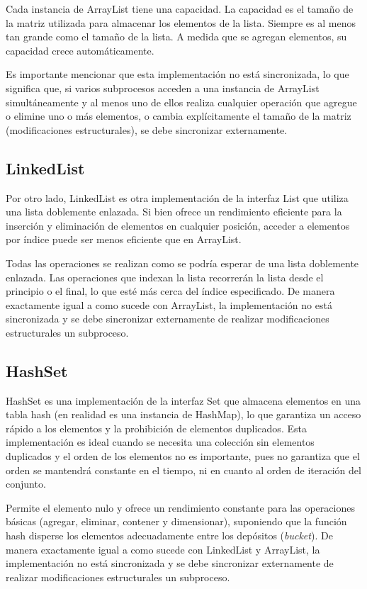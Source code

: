 \documentclass[a4paper,12pt]{article}
\begin{document}
Cada instancia de ArrayList tiene una capacidad. La capacidad es el tamaño de la matriz utilizada para almacenar los elementos de la lista. Siempre es al menos tan grande como el tamaño de la lista. A medida que se agregan elementos, su capacidad crece automáticamente.  \cite{array_list}

Es importante mencionar que esta implementación no está sincronizada, lo que significa que, si varios subprocesos acceden a una instancia de ArrayList simultáneamente y al menos uno de ellos realiza cualquier operación que agregue o elimine uno o más elementos, o cambia explícitamente el tamaño de la matriz (modificaciones estructurales), se debe sincronizar externamente. \cite{array_list}

\subsection{LinkedList}

Por otro lado, LinkedList es otra implementación de la interfaz List que utiliza una lista doblemente enlazada. Si bien ofrece un rendimiento eficiente para la inserción y eliminación de elementos en cualquier posición, acceder a elementos por índice puede ser menos eficiente que en ArrayList.

Todas las operaciones se realizan como se podría esperar de una lista doblemente enlazada. Las operaciones que indexan la lista recorrerán la lista desde el principio o el final, lo que esté más cerca del índice especificado.\cite{linked_list} De manera exactamente igual a como sucede con ArrayList, la implementación no está sincronizada y se debe sincronizar externamente de realizar modificaciones estructurales un subproceso.

\subsection{HashSet}

HashSet es una implementación de la interfaz Set que almacena elementos en una tabla hash (en realidad es una instancia de HashMap), lo que garantiza un acceso rápido a los elementos y la prohibición de elementos duplicados. Esta implementación es ideal cuando se necesita una colección sin elementos duplicados y el orden de los elementos no es importante, pues no garantiza que el orden se mantendrá constante en el tiempo, ni en cuanto al orden de iteración del conjunto.

Permite el elemento nulo y ofrece un rendimiento constante para las operaciones básicas (agregar, eliminar, contener y dimensionar), suponiendo que la función hash disperse los elementos adecuadamente entre los depósitos (\textit{bucket}). De manera exactamente igual a como sucede con LinkedList y ArrayList, la implementación no está sincronizada y se debe sincronizar externamente de realizar modificaciones estructurales un subproceso. \cite{hash_set}
\end{document}
